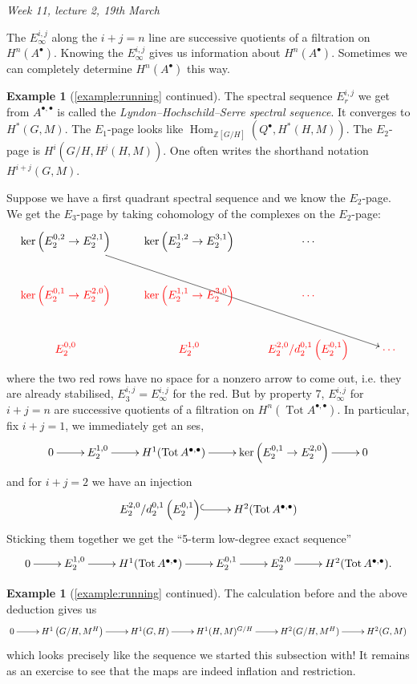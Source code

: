 \documentclass{article}
\newcommand{\Z}{\mathbb{Z}}
\newcommand{\Hom}{\operatorname{Hom}}
\newcommand{\Tot}{\operatorname{Tot}}
\theoremstyle{definition}
\newtheorem{example}[defn]{Example}
\begin{document}
\begin{flushright}
\textit{Week 11, lecture 2, 19th March}
\end{flushright}

The $E_\infty^{i,j}$ along the $i+j=n$ line are successive quotients of a filtration on $H^n(A^\bullet)$. Knowing the $E_\infty^{i,j}$ gives us information about $H^n(A^\bullet)$. Sometimes we can completely determine $H^n(A^\bullet)$ this way.

\begin{example}[\ref{example:running} continued]
The spectral sequence $E_r^{i,j}$ we get from $A^{\bullet,\bullet}$ is called the \textit{Lyndon--Hochschild--Serre spectral sequence}. It converges to $H^\ast(G,M)$. The $E_1$-page looks like $\Hom_{\Z[G/H]}\left(Q^\bullet,H^\ast(H,M)\right)$. The $E_2$-page is $H^i\left(G/H,H^j\left(H,M\right)\right)$. One often writes the shorthand notation $H^{i+j}(G,M)$.
\end{example}

Suppose we have a first quadrant spectral sequence and we know the $E_2$-page. We get the $E_3$-page by taking cohomology of the complexes on the $E_2$-page:
\[
\xymatrix{
\ker\left(E_2^{0,2}\rightarrow E_2^{2,1}\right)\ar[ddrrr] & \ker\left(E_2^{1,2}\rightarrow E_2^{3,1}\right) & \cdots \\
\color{red}\ker\left(E_2^{0,1}\rightarrow E_2^{2,0}\right) & \color{red}\ker\left(E_2^{1,1}\rightarrow E_2^{3,0}\right) & \color{red}\cdots  \\
\color{red}E_2^{0,0} & \color{red}E_2^{1,0} & \color{red}E_2^{2,0}/d_2^{0,1}\left(E_2^{0,1}\right) & \color{red}\cdots
}
\]
where the two red rows have no space for a nonzero arrow to come out, i.e. they are already stabilised, $E_3^{i,j}=E_\infty^{i,j}$ for the red. But by property 7, $E_\infty^{i,j}$ for $i+j=n$ are successive quotients of a filtration on $H^n(\Tot A^{\bullet,\bullet})$. In particular, fix $i+j=1$, we immediately get an ses,
\[
\xymatrix{
0\ar[r] & E_2^{1,0}\ar[r] & H^1(\Tot A^{\bullet,\bullet})\ar[r] & \ker\left(E_2^{0,1}\rightarrow E_2^{2,0}\right)\ar[r] & 0
}
\]
and for $i+j=2$ we have an injection
\[
\xymatrix{
E_2^{2,0}/d_2^{0,1}\left(E_2^{0,1}\right)\ar@{^{(}->}[r] & H^2(\Tot A^{\bullet,\bullet})
}
\]
Sticking them together we get the ``5-term low-degree exact sequence''
\[
\xymatrix{
0\ar[r] & E_2^{1,0}\ar[r] & H^1(\Tot A^{\bullet,\bullet})\ar[r] & E_2^{0,1}\ar[r] & E_2^{2,0}\ar[r] & H^2(\Tot A^{\bullet,\bullet}).
}
\]

\begin{example}[\ref{example:running} continued]
The calculation before and the above deduction gives us
\[
\xymatrix{
0\ar[r] & H^1\left(G/H,M^H\right)\ar[r] & H^1(G,H)\ar[r] & H^1(H,M)^{G/H} \ar[r] & H^2(G/H,M^H)\ar[r] & H^2(G,M)
}
\]
which looks precisely like the sequence we started this subsection with! It remains as an exercise to see that the maps are indeed inflation and restriction.
\end{example}
\end{document}
